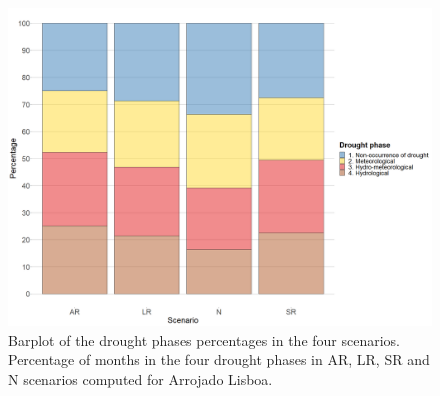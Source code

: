 \documentclass[draft]{agujournal2019}
\begin{document}
\begin{figure}
 \noindent\includegraphics[width=\textwidth]{images/Figure_7.png}
 \caption{Barplot of the drought phases percentages in the four scenarios. Percentage of months in the four drought phases in AR, LR, SR and N scenarios computed for Arrojado Lisboa.}
 \label{fig6}
\end{figure}
\end{document}
